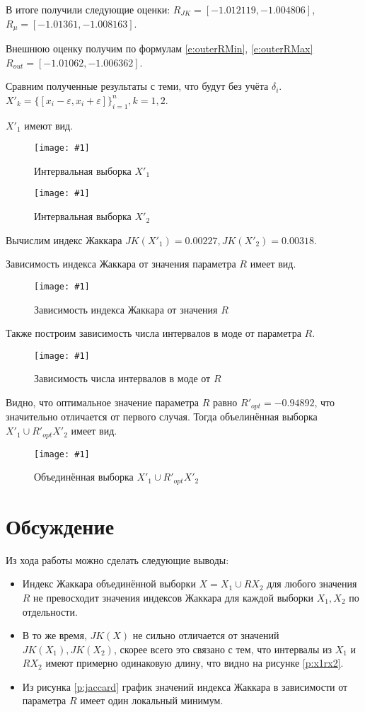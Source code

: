 \documentclass[a4paper,12pt]{article}
\newcommand{\plot}[3]{
    \begin{figure}[H]
        \begin{center}
            \texttt{[image: \#1]}
            \caption{#2}
            \label{#3}
        \end{center}
    \end{figure}
}
\begin{document}
    В итоге получили следующие оценки: $ R_{JK} = [-1.012119, -1.004806] $,
    $ R_{\mu} = [-1.01361, -1.008163] $.

    Внешнюю оценку получим по формулам \ref{e:outerRMin}, \ref{e:outerRMax}
    $ R_{out} = [-1.01062, -1.006362] $.

    Сравним полученные результаты с теми, что будут без учёта $ \delta_i $.
    $ X'_k = \{[x_i - \varepsilon, x_i + \varepsilon]\}^n_{i=1}, k = 1,2 $.

    $ X'_1 $ имеют вид.
    \plot{werr_X1}{Интервальная выборка $ X'_1 $}{p:werrX1}
    \plot{werr_X2}{Интервальная выборка $ X'_2 $}{p:werrX2}
    Вычислим индекс Жаккара $ JK(X'_1) = 0.00227, JK(X'_2) = 0.00318 $.

    Зависимость индекса Жаккара от значения параметра $ R $ имеет вид.
    \plot{werr_Jaccard}{Зависимость индекса Жаккара от значения $ R $}{p:werrJaccard}

    Также построим зависимость числа интервалов в моде от параметра $ R $.
    \plot{werr_ModaR}{Зависимость числа интервалов в моде от $ R $}{p:werrModa}

    Видно, что оптимальное значение параметра $ R $ равно $ R'_{opt} = -0.94892 $,
    что значительно отличается от первого случая. 
    Тогда объелинённая выборка $ X'_1 \cup R'_{opt} X'_2 $ имеет вид.
    \plot{werr_X1RX2}{Объединённая выборка $ X'_1 \cup R'_{opt} X'_2 $}{p:werrX1RX2}

    \section{Обсуждение}
    \quad Из хода работы можно сделать следующие выводы:
    \begin{itemize}
    \item Индекс Жаккара объединённой выборки $ X = X_1 \cup R X_2 $ для любого значения $ R $
    не превосходит значения индексов Жаккара для каждой выборки $ X_1, X_2 $ по отдельности.
    \item В то же время, $ JK(X) $ не сильно отличается от значений $ JK(X_1), JK(X_2) $,
    скорее всего это связано с тем, что интервалы из $ X_1 $ и $ R X_2 $ имеют примерно одинаковую длину,
    что видно на рисунке \ref{p:x1rx2}.
    \item Из рисунка \ref{p:jaccard} график значений индекса Жаккара
    в зависимости от параметра $ R $ имеет один локальный минимум.
    \end{itemize}

\end{document}
